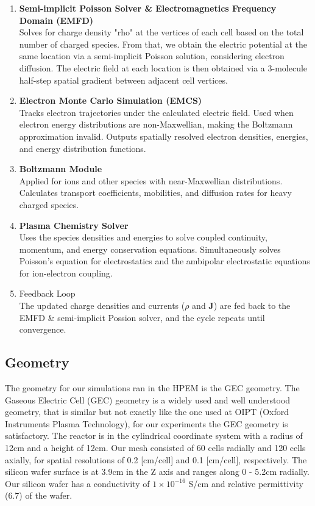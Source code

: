 \documentclass[12pt]{article}
\begin{document}
\begin{enumerate}
    \item{\textbf{Semi-implicit Poisson Solver \& Electromagnetics Frequency Domain (EMFD)}} \\
    Solves for charge density "rho" at the vertices of each cell based on the total number of charged species. From that, we obtain the electric potential at the same location via a semi-implicit Poisson solution, considering electron diffusion. The electric field at each location is then obtained via a 3-molecule half-step spatial gradient between adjacent cell vertices.

    \item{\textbf{Electron Monte Carlo Simulation (EMCS)}} \\
    Tracks electron trajectories under the calculated electric field. Used when electron energy distributions are non-Maxwellian, making the Boltzmann approximation invalid. Outputs spatially resolved electron densities, energies, and energy distribution functions.

    \item{\textbf{Boltzmann Module}} \\
    Applied for ions and other species with near-Maxwellian distributions. Calculates transport coefficients, mobilities, and diffusion rates for heavy charged species.

    \item{\textbf{Plasma Chemistry Solver}} \\
    Uses the species densities and energies to solve coupled continuity, momentum, and energy conservation equations. Simultaneously solves Poisson’s equation for electrostatics and the ambipolar electrostatic equations for ion-electron coupling.

    \item{Feedback Loop} \\
    The updated charge densities and currents ($\rho$ and $\mathbf{J}$) are fed back to the EMFD \& semi-implicit Possion solver, and the cycle repeats until convergence.
\end{enumerate}


\subsection{Geometry}

The geometry for our simulations ran in the HPEM is the GEC geometry. The Gaseous Electric Cell (GEC) geometry is a widely used and well understood geometry, that is similar but not exactly like the one used at OIPT (Oxford Instruments Plasma Technology), for our experiments the GEC geometry is satisfactory. The reactor is in the cylindrical coordinate system with a radius of 12cm and a height of 12cm. Our mesh consisted of 60 cells radially and 120 cells axially, for spatial resolutions of 0.2 [cm/cell] and 0.1 [cm/cell], respectively. The silicon wafer surface is at 3.9cm in the Z axis and ranges along 0 - 5.2cm radially. Our silicon wafer has a conductivity of $1\times10^{-16}$ S/cm and relative permittivity (6.7) of the wafer.
\end{document}
